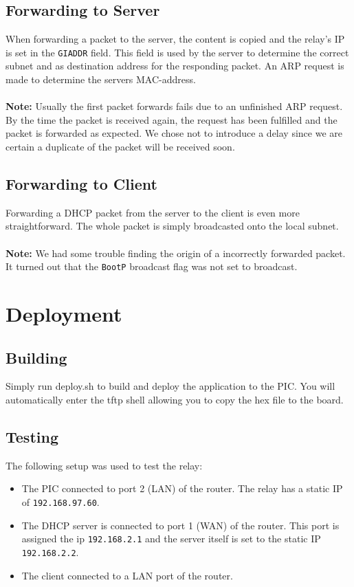 \documentclass[11pt]{article}
\begin{document}
\subsection{Forwarding to Server}
When forwarding a packet to the server, the content is copied and the relay's IP
is set in the \texttt{GIADDR} field. This field is used by the server to
determine the correct subnet and as destination address for the responding
packet. An ARP request is made to determine the servers MAC-address.
\\\\
\textbf{Note:} Usually the first packet forwards fails due to an unfinished ARP
request. By the time the packet is received again, the request has been
fulfilled and the packet is forwarded as expected. We chose not to introduce a
delay since we are certain a duplicate of the packet will be received soon.

\subsection{Forwarding to Client}
Forwarding a DHCP packet from the server to the client is even more
straightforward. The whole packet is simply broadcasted onto the local subnet.
\\\\
\textbf{Note:} We had some trouble finding the origin of a incorrectly forwarded
packet. It turned out that the \texttt{BootP} broadcast flag was not set to
broadcast.

\section{Deployment}

\subsection{Building}
Simply run deploy.sh to build and deploy the application to the PIC. You will
automatically enter the tftp shell allowing you to copy the hex file to the
board.

\subsection{Testing}
The following setup was used to test the relay:

\begin{itemize}
	\item The PIC connected to port 2 (LAN) of the router. The relay has a
	static IP of \texttt{192.168.97.60}.
	\item The DHCP server is connected to port 1 (WAN) of the router. This port
	is assigned the ip \texttt{192.168.2.1} and the server itself is set to the
	static IP \texttt{192.168.2.2}.
	\item The client connected to a LAN port of the router.
\end{itemize}
\end{document}
